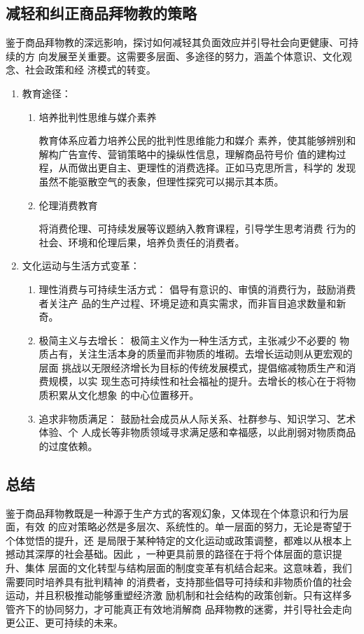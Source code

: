 \subsection{减轻和纠正商品拜物教的策略}
鉴于商品拜物教的深远影响，探讨如何减轻其负面效应并引导社会向更健康、可持续的方
向发展至关重要。这需要多层面、多途径的努力，涵盖个体意识、文化观念、社会政策和经
济模式的转变。

\begin{enumerate}
    \item 教育途径：
        \begin{enumerate}
            \item 培养批判性思维与媒介素养

            教育体系应着力培养公民的批判性思维能力和媒介
        素养，使其能够辨别和解构广告宣传、营销策略中的操纵性信息，理解商品符号价
        值的建构过程，从而做出更自主、更理性的消费选择。正如马克思所言，科学的
        发现虽然不能驱散空气的表象，但理性探究可以揭示其本质。
            \item 伦理消费教育

            将消费伦理、可持续发展等议题纳入教育课程，引导学生思考消费
        行为的社会、环境和伦理后果，培养负责任的消费者。
        \end{enumerate}
    \item 文化运动与生活方式变革：
    \begin{enumerate}
        \item 理性消费与可持续生活方式： 倡导有意识的、审慎的消费行为，鼓励消费者关注产
        品的生产过程、环境足迹和真实需求，而非盲目追求数量和新奇。
        \item 极简主义与去增长： 极简主义作为一种生活方式，主张减少不必要的
        物质占有，关注生活本身的质量而非物质的堆砌。去增长运动则从更宏观的层面
        挑战以无限经济增长为目标的传统发展模式，提倡缩减物质生产和消费规模，以实
        现生态可持续性和社会福祉的提升。去增长的核心在于将物质积累从文化想象
        的中心位置移开。
        \item 追求非物质满足： 鼓励社会成员从人际关系、社群参与、知识学习、艺术体验、个
        人成长等非物质领域寻求满足感和幸福感，以此削弱对物质商品的过度依赖。
    \end{enumerate}
\end{enumerate}

\subsection{总结}
鉴于商品拜物教既是一种源于生产方式的客观幻象，又体现在个体意识和行为层面，有效
的应对策略必然是多层次、系统性的。单一层面的努力，无论是寄望于个体觉悟的提升，还
是局限于某种特定的文化运动或政策调整，都难以从根本上撼动其深厚的社会基础。因此
，一种更具前景的路径在于将个体层面的意识提升、集体
层面的文化转型与结构层面的制度变革有机结合起来。这意味着，我们需要同时培养具有批判精神
的消费者，支持那些倡导可持续和非物质价值的社会运动，并且积极推动能够重塑经济激
励机制和社会结构的政策创新。只有这样多管齐下的协同努力，才可能真正有效地消解商
品拜物教的迷雾，并引导社会走向更公正、更可持续的未来。
